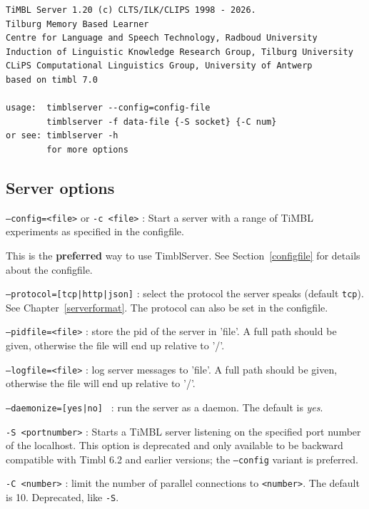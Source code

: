 \documentclass{report}
\begin{document}
{\footnotesize
\begin{verbatim}
TiMBL Server 1.20 (c) CLTS/ILK/CLIPS 1998 - 2026.
Tilburg Memory Based Learner
Centre for Language and Speech Technology, Radboud University
Induction of Linguistic Knowledge Research Group, Tilburg University
CLiPS Computational Linguistics Group, University of Antwerp
based on timbl 7.0

usage:  timblserver --config=config-file
        timblserver -f data-file {-S socket} {-C num}
or see: timblserver -h
        for more options
\end{verbatim}
}

\subsection{Server options}

\begin{description}

\item {\tt --config=<file>} or {\tt -c <file>} : Start a server with a
  range of TiMBL experiments as specified in the configfile.

This is the {\bf preferred} way to use TimblServer. See
Section~\ref{configfile} for details about the configfile.

\item {\tt --protocol=[tcp|http|json]} : select the protocol the
  server speaks (default {\tt tcp}). See Chapter~\ref{serverformat}.
  The protocol can also be set in the configfile.

\item {\tt --pidfile=<file>} : store the pid of the server in 'file'.
  A full path should be given, otherwise the file will end up relative
  to '/'.

\item {\tt --logfile=<file>} : log server messages to 'file'.  A full
  path should be given, otherwise the file will end up relative to
  '/'.

\item {\tt --daemonize=[yes|no] } : run the server as a daemon. The
  default is {\em yes}.

\item {\tt -S <portnumber>} : Starts a TiMBL server listening on the
  specified port number of the localhost.  This option is deprecated
  and only available to be backward compatible with Timbl 6.2 and
  earlier versions; the {\tt --config} variant is preferred.

\item {\tt -C <number>} : limit the number of parallel connections to
  {\tt <number>}. The default is 10. Deprecated, like {\tt -S}.

\end{description}
\end{document}
